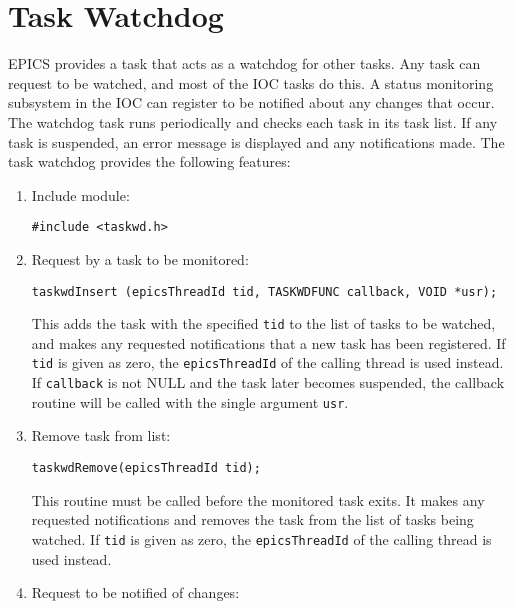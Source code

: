 \section{Task Watchdog}
\label{Task Watchdog}

EPICS provides a task that acts as a watchdog for other tasks. Any task can request to be watched, and most of the IOC 
tasks do this. A status monitoring subsystem in the IOC can register to be notified about any changes that occur. The 
watchdog task runs periodically and checks each task in its task list. If any task is suspended, an error message is 
displayed and any notifications made. The task watchdog provides the following features:

\begin{enumerate}
\item Include module:

\begin{verbatim}
#include <taskwd.h>
\end{verbatim}

\item Request by a task to be monitored:

\begin{verbatim}
taskwdInsert (epicsThreadId tid, TASKWDFUNC callback, VOID *usr);
\end{verbatim}

This adds the task with the specified \verb|tid| to the list of tasks to be watched, and makes any requested notifications 
that a new task has been registered. If \verb|tid| is given as zero, the \verb|epicsThreadId| of the calling thread is used 
instead. If \verb|callback| is not NULL and the task later becomes suspended, the callback routine will be called with 
the single argument \verb|usr|.

\item Remove task from list:

\begin{verbatim}
taskwdRemove(epicsThreadId tid);
\end{verbatim}

This routine must be called before the monitored task exits. It makes any requested notifications and removes the 
task from the list of tasks being watched. If \verb|tid| is given as zero, the \verb|epicsThreadId| of the calling thread is 
used instead.

\item Request to be notified of changes:


\end{enumerate}
